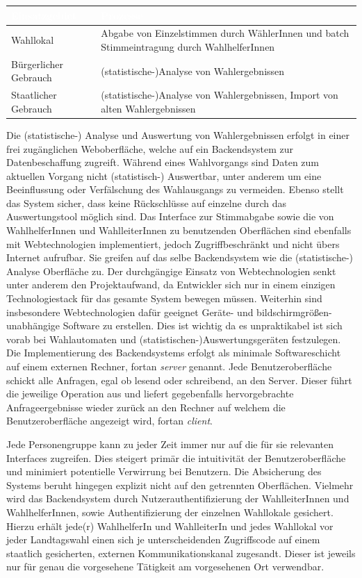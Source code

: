 \documentclass[a4paper,12pt]{article}
\begin{document}
\begin{center}
\begin{tabular}{|m{5cm}|m{10cm}|}
	\hline
  \rowcolor{TUMBlue} \textcolor{white}{\textbf{Einsatzgebiet}} & \textcolor{white}{\textbf{Prozesse}} \\
  \hline
  Wahllokal & Abgabe von Einzelstimmen durch WählerInnen und batch Stimmeintragung durch WahlhelferInnen \\
	\hline
  Bürgerlicher Gebrauch & (statistische-)Analyse von Wahlergebnissen \\
  \hline
  Staatlicher Gebrauch & (statistische-)Analyse von Wahlergebnissen, Import von alten Wahlergebnissen \\
	\hline
\end{tabular}
\end{center}

Die (statistische-) Analyse und Auswertung von Wahlergebnissen erfolgt in einer frei zugänglichen
Weboberfläche, welche auf ein Backendsystem zur Datenbeschaffung zugreift. 
Während eines Wahlvorgangs sind Daten zum aktuellen Vorgang nicht (statistisch-) Auswertbar,
unter anderem um eine Beeinflussung oder Verfälschung des Wahlausgangs zu vermeiden.
Ebenso stellt das System sicher, dass keine Rückschlüsse auf einzelne durch das Auswertungstool
möglich sind.
%
Das Interface zur Stimmabgabe sowie die von WahlhelferInnen und WahlleiterInnen zu benutzenden Oberflächen sind 
ebenfalls mit Webtechnologien implementiert, jedoch Zugriffbeschränkt und nicht übers Internet aufrufbar. Sie greifen
auf das selbe Backendsystem wie die (statistische-) Analyse Oberfläche zu.
%
Der durchgängige Einsatz von Webtechnologien senkt unter anderem den Projektaufwand, da Entwickler sich nur in 
einem einzigen Technologiestack für das gesamte System bewegen müssen. Weiterhin sind insbesondere 
Webtechnologien dafür geeignet Geräte- und bildschirmgrößen-unabhängige Software zu erstellen. Dies ist wichtig
da es unpraktikabel ist sich vorab bei Wahlautomaten und (statistischen-)Auswertungsgeräten festzulegen.
%
Die Implementierung des Backendsystems erfolgt als minimale Softwareschicht auf einem externen 
Rechner, fortan \textit{server} genannt. Jede Benutzeroberfläche schickt alle Anfragen, egal ob lesend oder schreibend, 
an den Server. Dieser führt die jeweilige Operation aus und liefert gegebenfalls hervorgebrachte
Anfrageergebnisse wieder zurück an den Rechner auf welchem die Benutzeroberfläche angezeigt wird, fortan \textit{client}.

Jede Personengruppe kann zu jeder Zeit immer nur auf die für sie relevanten Interfaces zugreifen.
Dies steigert primär die intuitivität der Benutzeroberfläche und minimiert potentielle Verwirrung
bei Benutzern. Die Absicherung des Systems beruht hingegen explizit nicht auf den getrennten 
Oberflächen. Vielmehr wird das Backendsystem durch Nutzerauthentifizierung der WahlleiterInnen und 
WahlhelferInnen, sowie Authentifizierung der einzelnen Wahllokale gesichert. Hierzu erhält jede(r)
WahlhelferIn und WahlleiterIn und jedes Wahllokal vor jeder Landtagswahl einen sich je unterscheidenden 
Zugriffscode auf einem staatlich gesicherten, externen Kommunikationskanal zugesandt. Dieser
ist jeweils nur für genau die vorgesehene Tätigkeit am vorgesehenen Ort verwendbar.
\end{document}
